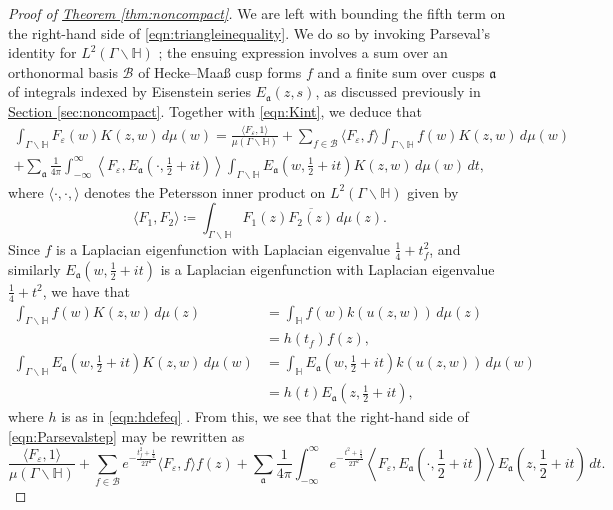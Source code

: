 \documentclass[11pt,a4paper]{amsart}
\newcommand{\af}{\mathfrak{a}}
\newcommand{\BB}{\mathcal{B}}
\newcommand{\e}{\varepsilon}
\newcommand{\Hb}{\mathbb{H}}
\numberwithin{equation}{section}
\theoremstyle{remark}
\theoremstyle{definition}
\begin{document}
\begin{proof}[Proof of {\hyperref[thm:noncompact]{Theorem \ref*{thm:noncompact}}}]
We are left with bounding the fifth term on the right-hand side of \eqref{eqn:triangleinequality}. We do so by invoking Parseval's identity for $L^2(\Gamma \backslash \Hb)$ \cite[Theorem 7.3]{Iwa02}; the ensuing expression involves a sum over an orthonormal basis $\BB$ of Hecke--Maa\ss{} cusp forms $f$ and a finite sum over cusps $\af$ of integrals indexed by Eisenstein series $E_{\af}(z,s)$, as discussed previously in \hyperref[sec:noncompact]{Section \ref*{sec:noncompact}}. Together with \eqref{eqn:Kint}, we deduce that
\begin{multline}
\label{eqn:Parsevalstep}
\int_{\Gamma \backslash \Hb} F_{\e}(w) K(z,w) \, d\mu(w) = \frac{\langle F_{\e},1\rangle}{\mu(\Gamma \backslash \Hb)} + \sum_{f \in \BB} \langle F_{\e},f\rangle \int_{\Gamma \backslash \Hb} f(w) K(z,w) \, d\mu(w)	\\
+ \sum_{\af} \frac{1}{4\pi} \int_{-\infty}^{\infty} \left\langle F_{\e}, E_{\af}\left(\cdot, \frac{1}{2} + it\right)\right\rangle \int_{\Gamma \backslash \Hb} E_{\af}\left(w,\frac{1}{2} + it\right) K(z,w) \, d\mu(w) \, dt,
\end{multline}
where $\langle \cdot,\cdot,\rangle$ denotes the Petersson inner product on $L^2(\Gamma \backslash \Hb)$ given by
\[\langle F_1,F_2\rangle \coloneqq \int_{\Gamma \backslash \Hb} F_1(z) \overline{F_2(z)} \, d\mu(z).\]
Since $f$ is a Laplacian eigenfunction with Laplacian eigenvalue $\frac{1}{4} + t_f^2$, and similarly $E_{\af}(w,\frac{1}{2} + it)$ is a Laplacian eigenfunction with Laplacian eigenvalue $\frac{1}{4} + t^2$, we have that
\begin{align*}
\int_{\Gamma \backslash \Hb} f(w) K(z,w) \, d\mu(z) & = \int_{\Hb} f(w) k(u(z,w)) \, d\mu(z)	\\
& = h(t_f) f(z),	\\
\int_{\Gamma \backslash \Hb} E_{\af}\left(w,\frac{1}{2} + it\right) K(z,w) \, d\mu(w) & = \int_{\Hb} E_{\af}\left(w,\frac{1}{2} + it\right) k(u(z,w)) \, d\mu(w)	\\
& = h(t) E_{\af}\left(z,\frac{1}{2} + it\right),
\end{align*}
where $h$ is as in \eqref{eqn:hdefeq} \cite[Theorem 1.14]{Iwa02}. From this, we see that the right-hand side of \eqref{eqn:Parsevalstep} may be rewritten as
\[\frac{\langle F_{\e},1\rangle}{\mu(\Gamma \backslash \Hb)} + \sum_{f \in \BB} e^{-\frac{t_f^2 + \frac{1}{4}}{2T^2}} \langle F_{\e},f\rangle f(z) + \sum_{\af} \frac{1}{4\pi} \int_{-\infty}^{\infty} e^{-\frac{t^2 + \frac{1}{4}}{2T^2}} \left\langle F_{\e}, E_{\af}\left(\cdot, \frac{1}{2} + it\right)\right\rangle E_{\af}\left(z,\frac{1}{2} + it\right) \, dt.\]

\end{proof}
\end{document}
